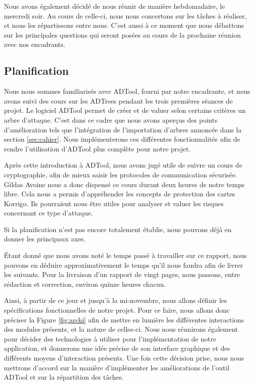 	    Nous avons également décidé de nous réunir de manière hebdomadaire, le mercredi soir. Au cours de celle-ci, nous nous concertons sur les tâches à réaliser, et nous les répartissons entre nous. C'est aussi à ce moment que nous débattons sur les principales questions qui seront posées au cours de la prochaine réunion avec nos encadrants.

	    
	\subsection{Planification}


		Nous nous sommes familiarisés avec ADTool, fourni par notre encadrante, et nous avons suivi des cours sur les ADTrees pendant les trois premières séances de projet. Le logiciel ADTool permet de créer et de valuer selon certains critères un arbre d'attaque. C'est dans ce cadre que nous avons aperçus des points d'amélioration tels que l'intégration de l'importation d'arbres annoncée dans la section \ref{sec:cahier}. Nous implémenterons ces différentes fonctionnalités afin de rendre l'utilisation d'ADTool plus complète pour notre projet.
	    
	    Après cette introduction à ADTool, nous avons jugé utile de suivre un cours de cryptographie, afin de mieux saisir les protocoles de communication sécurisée. Gildas Avoine nous a donc dispensé ce cours durant deux heures de notre temps libre. Cela nous a permis d'appréhender les concepts de protection des cartes Korrigo. Ils pourraient nous être utiles pour analyser et valuer les risques concernant ce type d'attaque.
			
		Si la planification n'est pas encore totalement établie, nous pouvons déjà en donner les principaux axes.

		Étant donné que nous avons noté le temps passé à travailler sur ce rapport, nous pouvons en déduire approximativement le temps qu'il nous faudra afin de livrer les suivants. Pour la livraison d'un rapport de vingt pages, nous passons, entre rédaction et correction, environ quinze heures chacun.

		Ainsi, à partir de ce jour et jusqu'à la mi-novembre, nous allons définir les spécifications fonctionnelles de notre projet.
		Pour ce faire, nous allons donc préciser la Figure \ref{fig:archi} afin de mettre en lumière les différentes interactions des modules présents, et la nature de celles-ci. Nous nous réunirons également pour décider des technologies à utiliser pour l'implémentation de notre application, et donnerons une idée précise de son interface graphique et des différents moyens d'interaction présents.
		Une fois cette décision prise, nous nous mettrons d'accord sur la manière d'implémenter les améliorations de l'outil ADTool et sur la répartition des tâches.

